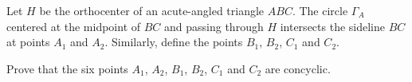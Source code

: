 Let $ H$ be the orthocenter of an acute-angled triangle $ ABC$. The circle $ \Gamma_{A}$ centered at the midpoint of $ BC$ and passing through $ H$ intersects the sideline $ BC$ at points  $ A_{1}$ and $ A_{2}$. Similarly, define the points $ B_{1}$, $ B_{2}$, $ C_{1}$ and $ C_{2}$.

Prove that the six points $ A_{1}$, $ A_{2}$, $ B_{1}$, $ B_{2}$,  $ C_{1}$ and $ C_{2}$ are concyclic.
